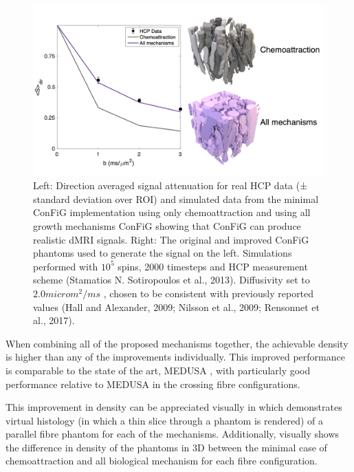 \begin{figure}
  \centering
  \includegraphics[width=\textwidth]{figures/config/hcp_old_vs_new_figure_whitebg.png}
  \caption[Impact of improvements on simulated \ac{dMRI} signal]{Left: Direction averaged signal attenuation for real \ac{HCP} data (± standard deviation over ROI) and simulated data from the minimal \ac{ConFiG} implementation using only chemoattraction and using all growth mechanisms \ac{ConFiG} showing that \ac{ConFiG} can produce realistic \ac{dMRI} signals. Right: The original and improved \ac{ConFiG} phantoms used to generate the signal on the left. Simulations performed with $10^5$ spins, 2000 timesteps and \ac{HCP} measurement scheme (Stamatios N. Sotiropoulos et al., 2013). Diffusivity set to $2.0microm ^2/ms$ , chosen to be consistent with previously reported values (Hall and Alexander, 2009; Nilsson et al., 2009; Rensonnet et al., 2017).  }
  \label{fig:config_res_improvements_sig}
\end{figure}

When combining all of the proposed mechanisms together, the achievable density is higher than any of the improvements individually. This improved performance is comparable to the state of the art, MEDUSA \cite{Ginsburger2019}, with particularly good performance relative to MEDUSA in the crossing fibre configurations.

This improvement in density can be appreciated visually in  which demonstrates virtual histology (in which a thin slice through a phantom is rendered) of a parallel fibre phantom for each of the mechanisms. Additionally,  visually shows the difference in density of the phantoms in 3D between the minimal case of chemoattraction and all biological mechanism for each fibre configuration.

